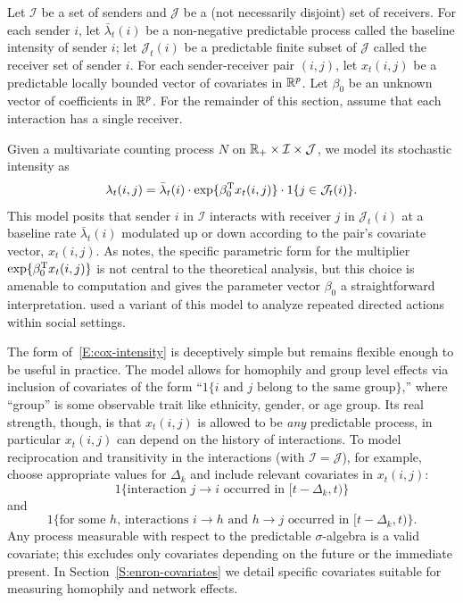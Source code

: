 \documentclass[final]{statsoc}
\begin{document}
Let $\mathcal{I}$ be a set of senders and $\mathcal{J}$ be a (not necessarily disjoint) set of receivers.
For each sender $i$, let $\bar \lambda_t(i)$ be a non-negative predictable
process called the baseline intensity of sender $i$; let $\mathcal{J}_t(i)$ be
a predictable finite subset of $\mathcal{J}$ called the receiver set of sender $i$.
For each sender-receiver pair $(i,j)$, let $x_t(i,j)$ be a predictable
locally bounded vector of covariates in $\mathbb{R}^p$.  Let $\beta_0$
be an unknown vector of coefficients in  $\mathbb{R}^p$.  For the remainder of
this section, assume that each interaction has a single receiver.

Given a multivariate counting process $N$ on
$\mathbb{R}_+ \times \mathcal{I} \times \mathcal{J}$,
we model its stochastic intensity as
\begin{equation}\label{E:cox-intensity}
    \lambda_t(i,j)
        =
        \bar \lambda_t(i)
        \cdot
        \exp\{ \beta_0^{\mathrm{T}} x_t(i, j) \}
        \cdot
        1{\{j \in \mathcal{J}_t(i)\}}.
\end{equation}
This model posits that sender $i$ in $\mathcal{I}$ interacts  with receiver $j$
in $\mathcal{J}_t(i)$ at a baseline rate $\bar \lambda_t(i)$ modulated up or
down according to the pair's covariate vector, $x_t(i,j)$.  As
\citet{efron1977efficiency} notes, the specific parametric form for the multiplier
$\exp\{ \beta_0^{\mathrm{T}} x_t(i,j) \}$ is not central to the theoretical
analysis, but this choice is amenable to computation and gives
the parameter vector $\beta_0$ a straightforward interpretation.
\citet{butts2008relational} used a variant of this model to analyze
repeated directed actions within social settings.

The form of~\eqref{E:cox-intensity} is deceptively simple but remains
flexible enough to be useful in practice.  The model allows for
homophily and group level effects via inclusion of covariates of the form
``$1\{\text{$i$ and $j$ belong to the same group}\}$,'' where ``group'' is
some observable trait like ethnicity, gender, or age group.  Its real
strength, though, is that $x_t(i,j)$ is allowed to be \emph{any}
predictable process, in particular $x_t(i,j)$ can depend on the history
of interactions.  To model reciprocation and transitivity in the
interactions  (with $\mathcal{I} = \mathcal{J}$), for example, choose appropriate
values for $\Delta_k$ and include relevant covariates in $x_t(i,j)$:
\[
    1\{\text{interaction $j \to i$ occurred in $[t - \Delta_k,t)$}\}
\]
and
\[
    1\{\text{for some $h$, interactions $i\to h$ and $h \to j$ occurred in
             $[t - \Delta_k, t)$}\}.
\]
Any process measurable with respect to the predictable $\sigma$-algebra is
a valid covariate; this excludes only covariates depending on the future
or the immediate present.  In
Section~\ref{S:enron-covariates} we detail specific covariates suitable for
measuring homophily and network effects.
\end{document}
